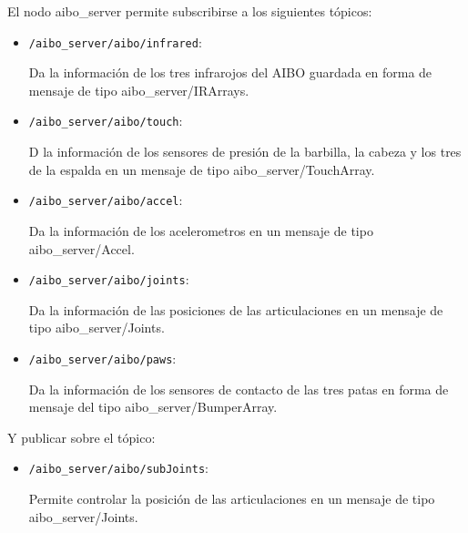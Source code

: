 \documentclass[12pt,a4paper,final,twoside]{book}
\begin{document}
El nodo aibo{\_}server permite subscribirse a los siguientes tópicos:
\begin{itemize}
\item \texttt{/aibo{\_}server/aibo/infrared}:
 
Da la información de los tres infrarojos del AIBO guardada en forma de mensaje de tipo aibo{\_}server/IRArrays.  

\item \texttt{/aibo{\_}server/aibo/touch}:

D la información de los sensores de presión de la barbilla, la cabeza y los tres de la espalda en un mensaje de tipo aibo{\_}server/TouchArray.

\item \texttt{/aibo{\_}server/aibo/accel}:

Da la información de los acelerometros en un mensaje de tipo aibo{\_}server/Accel.

\item \texttt{/aibo{\_}server/aibo/joints}:

Da la información de las posiciones de las articulaciones en un mensaje de tipo aibo{\_}server/Joints.

\item \texttt{/aibo{\_}server/aibo/paws}:

Da la información de los sensores de contacto de las tres patas en forma de mensaje del tipo aibo{\_}server/BumperArray.


\end{itemize}
Y publicar sobre el tópico:
\begin{itemize}
\item \texttt{/aibo{\_}server/aibo/subJoints}:

Permite controlar la posición de las articulaciones en un mensaje de tipo aibo{\_}server/Joints.

\end{itemize}
\end{document}
